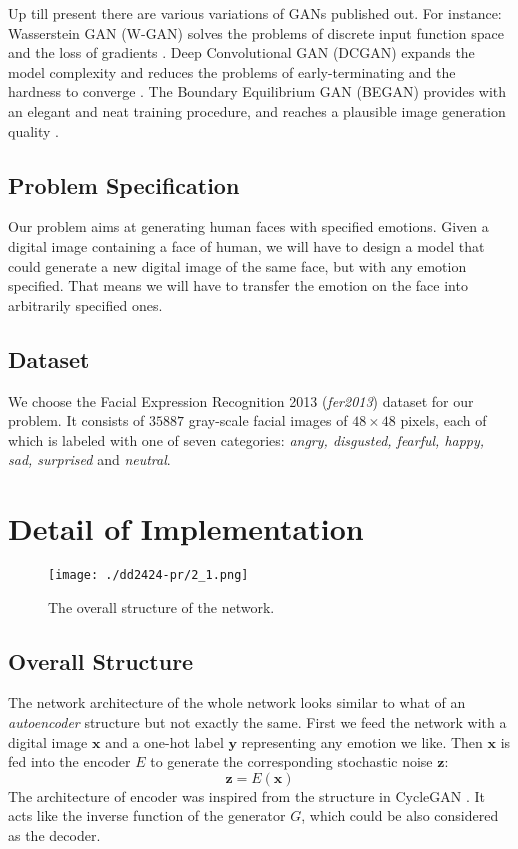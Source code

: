 \documentclass[runningheads]{llncs}
\begin{document}
Up till present there are various variations of GANs published out. For instance: Wasserstein GAN (W-GAN) solves the problems of discrete input function space and the loss of gradients \cite{arjovsky_chintala_bottou_2017}. Deep Convolutional GAN (DCGAN) expands the model complexity and reduces the problems of early-terminating and the hardness to converge \cite{radford_metz_chintala_2016}. The Boundary Equilibrium GAN (BEGAN) provides with an elegant and neat training procedure, and reaches a plausible image generation quality \cite{berthelot_schumm_metz_2017}.

\subsection{Problem Specification}
Our problem aims at generating human faces with specified emotions. Given a digital image containing a face of human, we will have to design a model that could generate a new digital image of the same face, but with any emotion specified. That means we will have to transfer the emotion on the face into arbitrarily specified ones.

\subsection{Dataset}
We choose the Facial Expression Recognition 2013 (\textit{fer2013}) dataset for our problem. It consists of $35887$ gray-scale facial images of $48\times48$ pixels, each of which is labeled with one of seven categories: \textit{angry, disgusted, fearful, happy, sad, surprised} and \textit{neutral}.
\section{Detail of Implementation}
\begin{figure}
\begin{center}
\texttt{[image: ./dd2424-pr/2\_1.png]}
\caption{The overall structure of the network.}
\end{center}
\end{figure}

\subsection{Overall Structure}
The network architecture of the whole network looks similar to what of an \textit{autoencoder} structure but not exactly the same. First we feed the network with a digital image $\textbf{x}$ and a one-hot label $\textbf{y}$ representing any emotion we like. Then $\textbf{x}$ is fed into the encoder $E$ to generate the corresponding stochastic noise $\textbf{z}$:
\begin{equation}
\textbf{z}=E(\textbf{x})
\end{equation}
The architecture of encoder was inspired from the structure in CycleGAN \cite{zhu_park_isola_efros_2017}. It acts like the inverse function of the generator $G$, which could be also considered as the decoder.
\end{document}
